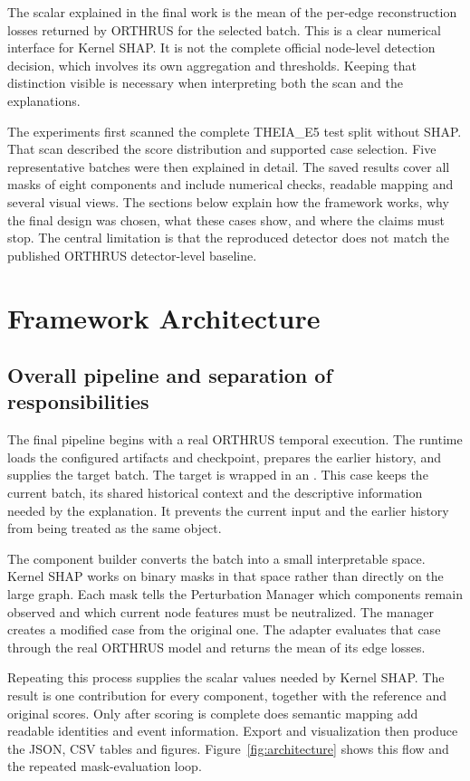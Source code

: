\documentclass[11pt,a4paper]{article}
\newcommand{\code}[1]{\texttt{\detokenize{#1}}}
\begin{document}
The scalar explained in the final work is the mean of the per-edge
reconstruction losses returned by ORTHRUS for the selected batch. This is a
clear numerical interface for Kernel SHAP. It is not the complete official
node-level detection decision, which involves its own aggregation and
thresholds. Keeping that distinction visible is necessary when interpreting
both the scan and the explanations.

The experiments first scanned the complete THEIA\_E5 test split without SHAP.
That scan described the score distribution and supported case selection. Five
representative batches were then explained in detail. The saved results cover
all masks of eight components and include numerical checks, readable mapping
and several visual views. The sections below explain how the framework works,
why the final design was chosen, what these cases show, and where the claims
must stop. The central limitation is that the reproduced detector does not
match the published ORTHRUS detector-level baseline.

\section{Framework Architecture}
\subsection{Overall pipeline and separation of responsibilities}
The final pipeline begins with a real ORTHRUS temporal execution. The runtime
loads the configured artifacts and checkpoint, prepares the earlier history,
and supplies the target \code{TemporalData} batch. The target is wrapped in
an \code{OrthrusAlertCase}. This case keeps the current batch, its shared
historical context and the descriptive information needed by the explanation.
It prevents the current input and the earlier history from being treated as
the same object.

The component builder converts the batch into a small interpretable space.
Kernel SHAP works on binary masks in that space rather than directly on the
large graph. Each mask tells the Perturbation Manager which components remain
observed and which current node features must be neutralized. The manager
creates a modified case from the original one. The adapter evaluates that case
through the real ORTHRUS model and returns the mean of its edge losses.

Repeating this process supplies the scalar values needed by Kernel SHAP. The
result is one contribution for every component, together with the reference
and original scores. Only after scoring is complete does semantic mapping add
readable identities and event information. Export and visualization then
produce the JSON, CSV tables and figures. Figure~\ref{fig:architecture} shows
this flow and the repeated mask-evaluation loop.
\end{document}
